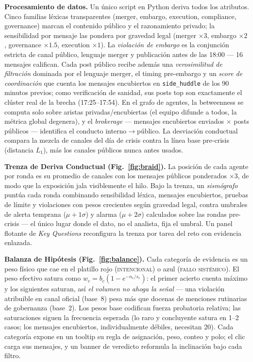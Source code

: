 \documentclass{vgtc}                %
\begin{document}
\textbf{Procesamiento de datos.} Un \'unico script en Python deriva
todos los atributos. Cinco familias l\'exicas transparentes (merger,
embargo, execution, compliance, governance) marcan el contenido
p\'ublico y el razonamiento privado; la sensibilidad por mensaje las
pondera por gravedad legal (merger $\times 3$, embargo $\times 2$,
governance $\times 1.5$, execution $\times 1$). La \emph{violaci\'on
de embargo} es la conjunci\'on estricta de canal p\'ublico, lenguaje
merger y publicaci\'on antes de las 18:00 --- 16 mensajes califican.
Cada post p\'ublico recibe adem\'as una \emph{verosimilitud de
filtraci\'on} dominada por el lenguaje merger, el timing pre-embargo y
un \emph{score de coordinaci\'on} que cuenta los mensajes encubiertos
en \texttt{side\_huddle} de los 90 minutos previos; como
verificaci\'on de sanidad, sus posts top son exactamente el cl\'uster
real de la brecha (17:25--17:54). En el grafo de agentes, la
betweenness se computa solo sobre aristas privadas/encubiertas (el
equipo difunde a todos, la m\'etrica global degenera), y el
\emph{brokerage} --- mensajes encubiertos enviados $\times$ posts
p\'ublicos --- identifica el conducto interno$\rightarrow$p\'ublico.
La desviaci\'on conductual compara la mezcla de canales del d\'ia de
crisis contra la l\'inea base pre-crisis (distancia $L_1$), m\'as los
canales p\'ublicos nunca antes usados.

\textbf{Trenza de Deriva Conductual (Fig.~\ref{fig:braid}).} La
posici\'on de cada agente por ronda es su promedio de canales con los
mensajes p\'ublicos ponderados $\times 3$, de modo que la exposici\'on
jala visiblemente el hilo. Bajo la trenza, un \emph{sism\'ografo}
punt\'ua cada ronda combinando sensibilidad l\'exica, mensajes
encubiertos, pruebas de l\'imite y violaciones con pesos crecientes
seg\'un gravedad legal, contra umbrales de alerta temprana
($\mu{+}1\sigma$) y alarma ($\mu{+}2\sigma$) calculados sobre las
rondas pre-crisis --- el \'unico lugar donde el dato, no el analista,
fija el umbral. Un panel flotante de \emph{Key Questions} reconfigura
la trenza por tarea del reto con evidencia enlazada.

\textbf{Balanza de Hip\'otesis (Fig.~\ref{fig:balance}).} Cada
categor\'ia de evidencia es un peso f\'isico que cae en el platillo
rojo (\textsc{intencional}) o azul (\textsc{fallo sist\'emico}). El
peso efectivo satura como $w_c=b_c(1-e^{-n_c/s_c})$: el primer acierto
cuenta m\'aximo y los siguientes saturan, as\'i \emph{el volumen no
ahoga la se\~nal} --- una violaci\'on atribuible en canal oficial
(base~8) pesa m\'as que docenas de menciones rutinarias de gobernanza
(base~2). Los pesos base codifican fuerza probatoria relativa; las
saturaciones siguen la frecuencia esperada (lo raro y concluyente
satura en 1--2 casos; los mensajes encubiertos, individualmente
d\'ebiles, necesitan 20). Cada categor\'ia expone en un tooltip su
regla de asignaci\'on, peso, conteo y polo; el clic carga sus
mensajes, y un banner de veredicto reformula la inclinaci\'on bajo
cada filtro.
\end{document}
